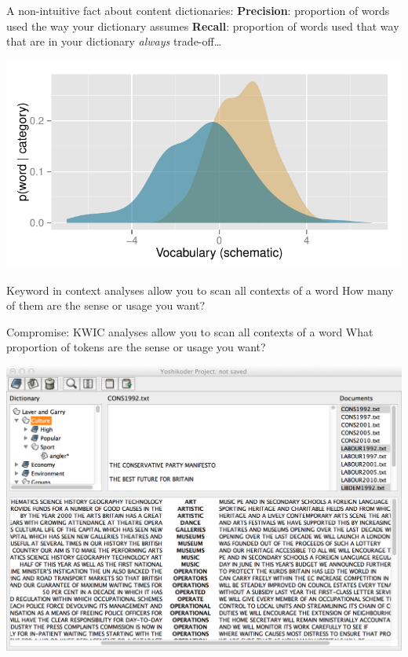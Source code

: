 \documentclass{mediumfoils}
\begin{document}

A non-intuitive fact about content dictionaries:
\ita
\itm \textbf{Precision}: proportion of words used the way your dictionary assumes
\itm \textbf{Recall}: proportion of words used that way that are in your dictionary
\itz
\textit{always} trade-off\ldots 


\centerline{\includegraphics[scale=1.7]{pictures/schematic-vocab}}


Keyword in context analyses allow you to scan all contexts of a word
\ita
\itm How many of them are the sense or usage you want?
\itz

Compromise: KWIC analyses allow you to scan all contexts of a word
\ita
\itm What proportion of tokens are the sense or usage you want?
\itz

\newpage

\centerline{\includegraphics[scale=.7]{pictures/yk-measurement-error}}
\end{document}
